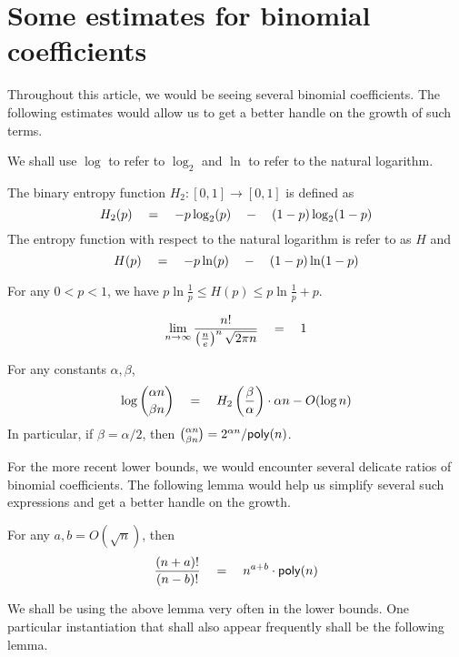 \chapter{Some estimates for binomial coefficients}

Throughout this article, we would be seeing several binomial coefficients. The following estimates would allow us to get a better handle on the growth of such terms. 

We shall use $\log$ to refer to $\log_2$ and $\ln$ to refer to the natural logarithm. 


\begin{definition}\label{def:entropy}
The binary entropy function $H_2:[0,1]\rightarrow [0,1]$ is defined as
\[
H_2(p) \quad = \quad - p \log_2(p) \quad - \quad (1-p) \log_2(1-p)
\]
The entropy function with respect to the natural logarithm is refer to as $H$ and
\[
H(p) \quad = \quad - p \ln(p) \quad - \quad (1-p) \ln(1-p)
\]
\end{definition}

\begin{proposition}\label{prop:entropy-estimate}
For any $0< p  < 1$, we have $p\ln\frac{1}{p} \leq H(p) \leq p\ln\frac{1}{p} + p$. 
\end{proposition}

\begin{proposition}\label{prop:sterling}
\[
\lim_{n\rightarrow \infty}\frac{n!}{\left(\frac{n}{e}\right)^n \sqrt{2\pi n}}  \quad=\quad 1
\]
\end{proposition}

\begin{proposition}
For any constants $\alpha, \beta$, 
\[
\log\binom{\alpha n}{\beta n} \quad = \quad H_2\left(\frac{\beta}{\alpha}\right) \cdot \alpha n - O(\log n)
\]
In particular, if $\beta = \alpha/2$, then $\binom{\alpha n}{\beta{n}} = 2^{\alpha n} / \mathsf{poly}(n)$. 
\end{proposition}

For the more recent lower bounds, we would encounter several delicate ratios of binomial coefficients. The following lemma would help us simplify several such expressions and get a better handle on the growth. 

\begin{lemma}{\cite[Lemma 6]{gkks13}}\label{lem:factorial-ratio} For any $a,b = O(\sqrt{n})$, then
\[
\frac{(n+a)!}{(n-b)!}\quad=\quad n^{a + b} \cdot \mathsf{poly}(n)
\]
\end{lemma}

We shall be using the above lemma very often in the lower bounds. One particular instantiation that shall also appear frequently shall be the following lemma.  

